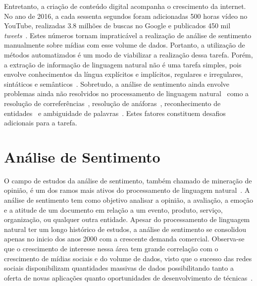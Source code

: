 Entretanto, a criação de conteúdo digital acompanha o crescimento da internet.
No ano de 2016, a cada sessenta segundos foram adicionadas 500 horas vídeo no YouTube, realizadas 3.8 milhões de buscas
no Google e publicados 450 mil \textit{tweets}~\cite{smartinsights}.
Estes números tornam impraticável a realização de análise de sentimento manualmente sobre mídias com esse volume de
dados.
Portanto, a utilização de métodos automatizados é um modo de viabilizar a realização dessa tarefa.
Porém, a extração de informação de linguagem natural não é uma tarefa simples, pois envolve conhecimentos da língua
explícitos e implícitos, regulares e irregulares, sintáticos e semânticos~\cite{cambria13}.
Sobretudo, a análise de sentimento ainda envolve problemas ainda não resolvidos no processamento de linguagem
natural~\cite{cambria13}
como a resolução de correferências~\cite{soon01}, resolução de anáforas~\cite{lappin94}, reconhecimento de
entidades~\cite{nadeau07} e ambiguidade de palavras~\cite{yarowsky95}.
Estes fatores constituem desafios adicionais para a tarefa.

\section{Análise de Sentimento}

O campo de estudos da análise de sentimento, também chamado de mineração de opinião, é um dos ramos mais ativos do
processamento de linguagem natural~\cite{liu12}.
A análise de sentimento tem como objetivo analisar a opinião, a avaliação, a emoção e a atitude de um documento em
relação a um evento, produto, serviço, organização, ou qualquer outra entidade.
Apesar do processamento de linguagem natural ter um longo histórico de estudos, a análise de sentimento se consolidou
apenas no inicio dos anos 2000 com a crescente demanda comercial.
Observa-se que o crescimento de interesse nessa área tem grande correlação com o crescimento de mídias sociais e do
volume de dados, visto que o sucesso das redes sociais disponibilizam quantidades massivas de dados possibilitando tanto
a oferta de novas aplicações quanto oportunidades de desenvolvimento de técnicas~\cite{liu12}.

